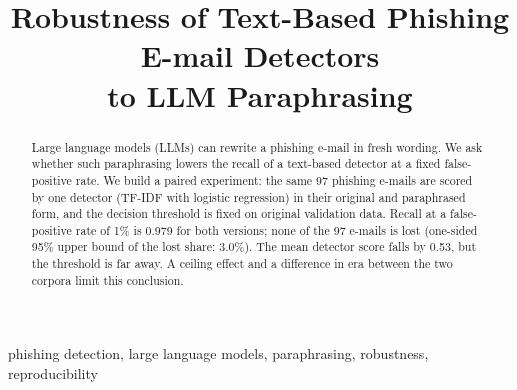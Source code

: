 \documentclass[conference]{IEEEtran}
\begin{document}
\title{Robustness of Text-Based Phishing E-mail Detectors\\to LLM Paraphrasing}

\author{
\and
{}
}

\maketitle

\begin{abstract}
Large language models (LLMs) can rewrite a phishing e-mail in fresh wording. We ask whether such paraphrasing lowers the recall of a text-based detector at a fixed false-positive rate. We build a paired experiment: the same 97 phishing e-mails are scored by one detector (TF-IDF with logistic regression) in their original and paraphrased form, and the decision threshold is fixed on original validation data. Recall at a false-positive rate of 1\% is 0.979 for both versions; none of the 97 e-mails is lost (one-sided 95\% upper bound of the lost share: 3.0\%). The mean detector score falls by 0.53, but the threshold is far away. A ceiling effect and a difference in era between the two corpora limit this conclusion.
\end{abstract}

\begin{IEEEkeywords}
phishing detection, large language models, paraphrasing, robustness, reproducibility
\end{IEEEkeywords}









\end{document}

